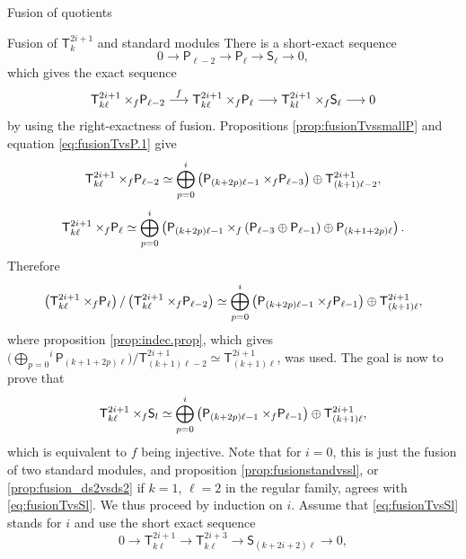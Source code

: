 \documentclass[reqno]{amsart}
\newcommand{\ds}[1]{\mathsf S_{#1}}
\newcommand{\dP}[1]{\mathsf P_{#1}}
\newcommand{\xf}{\times\hspace{-0.27em}_f}
\newcommand{\T}[2]{\mathsf{T}^{#1}_{#2}}
\newcommand{\lc}{\ell}
\begin{document}
\begin{section}{Fusion of quotients}
\begin{subsection}{Fusion of $\T{2i+1}{k}$ and standard modules}
There is a short-exact sequence
\begin{equation*}
0 \longrightarrow \dP{\lc-2} \longrightarrow \dP{\lc} \longrightarrow \ds{\lc} \longrightarrow 0,
\end{equation*}
which gives the exact sequence
\begin{equation}\label{eq:sesTvsS.1}
\T{2i+1}{k\lc}\xf\dP{\lc-2} \overset{f}{\longrightarrow} \T{2i+1}{k\lc}\xf\dP{\lc} \longrightarrow \T{2i+1}{kl}\xf\ds{\lc} \longrightarrow 0
\end{equation}
by using the right-exactness of fusion. Propositions \ref{prop:fusionTvssmallP} and equation \eqref{eq:fusionTvsP.1} give
\begin{equation*}
\T{2i+1}{k\lc} \xf \dP{\lc-2} \simeq \overset{i}{\underset{p=0}{\bigoplus}}\left( \dP{(k+2p)\lc-1} \xf \dP{\lc-3}\right) \oplus \T{2i+1}{(k+1)\lc-2},
\end{equation*}
\begin{equation*}
\T{2i+1}{k\lc}\xf\dP{\lc} \simeq \overset{i}{\underset{p=0}{\bigoplus}}\left( \dP{(k+2p)\lc-1}\xf \left(\dP{\lc-3}\oplus \dP{\lc-1}\right) \oplus \dP{(k+1+2p)\lc}\right).
\end{equation*}
Therefore
\begin{equation}
\left(\T{2i+1}{k\lc}\xf\dP{\lc}\right) / \left( \T{2i+1}{k\lc}\xf\dP{\lc-2}\right) \simeq \overset{i}{\underset{p=0}{\bigoplus}}\left( \dP{(k+2p)\lc-1} \xf \dP{\lc-1}\right) \oplus \T{2i+1}{(k+1)\lc},
\end{equation}
where proposition \ref{prop:indec.prop}, which gives $ \Big(\overset{i}{\underset{p=0}{\bigoplus}}  \dP{(k+1+2p)\lc} \Big)/ \T{2i+1}{(k+1)\lc-2} \simeq \T{2i+1}{(k+1)\lc}$, was used. The goal is now to prove that
\begin{equation}\label{eq:fusionTvsSl}
\T{2i+1}{k\lc}\xf\ds{l} \simeq \overset{i}{\underset{p=0}{\bigoplus}}\left( \dP{(k+2p)\lc-1} \xf \dP{\lc-1}\right) \oplus \T{2i+1}{(k+1)\lc},
\end{equation}
which is equivalent to $f$ being injective. Note that for $i=0$, this is just the fusion of two standard modules, and proposition \ref{prop:fusionstandvssl}, or \ref{prop:fusion_ds2vsds2} if $k=1$, $\lc =2$ in the regular family, agrees with \eqref{eq:fusionTvsSl}. We thus proceed by induction on $i$. Assume that \eqref{eq:fusionTvsSl} stands for $i$ and use the short exact sequence
\begin{equation*}
0 \longrightarrow \T{2i+1}{k\lc} \longrightarrow \T{2i+3}{k\lc} \longrightarrow \ds{(k+2i+2)\lc} \longrightarrow 0,
\end{equation*}

\end{subsection}
\end{section}
\end{document}
